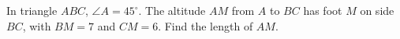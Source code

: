 In triangle \(ABC\), \(\angle A=45^\circ\). The altitude \(AM\) from \(A\) to \(BC\) has foot \(M\) on side \(BC\), with \(BM=7\) and \(CM=6\). Find the length of \(AM\).
